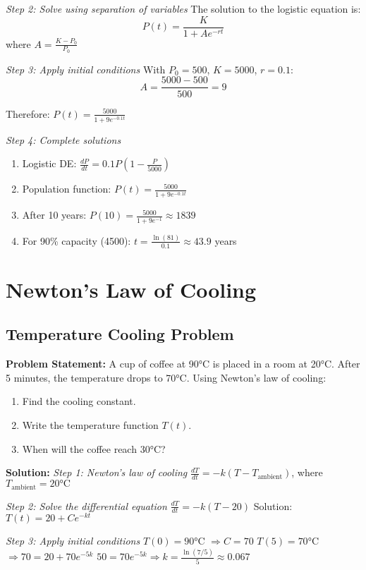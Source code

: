\documentclass[12pt, letterpaper]{book}
\begin{document}
\textit{Step 2: Solve using separation of variables}
The solution to the logistic equation is:
$$P(t) = \frac{K}{1 + Ae^{-rt}}$$
where $A = \frac{K-P_0}{P_0}$

\textit{Step 3: Apply initial conditions}
With $P_0 = 500$, $K = 5000$, $r = 0.1$:
$$A = \frac{5000-500}{500} = 9$$

Therefore: $P(t) = \frac{5000}{1 + 9e^{-0.1t}}$

\textit{Step 4: Complete solutions}
\begin{enumerate}
    \item Logistic DE: $\frac{dP}{dt} = 0.1P\left(1-\frac{P}{5000}\right)$
    \item Population function: $P(t) = \frac{5000}{1 + 9e^{-0.1t}}$
    \item After 10 years: $P(10) = \frac{5000}{1 + 9e^{-1}} \approx 1839$
    \item For 90\% capacity (4500): $t = \frac{\ln(81)}{0.1} \approx 43.9$ years
\end{enumerate}

\section{Newton's Law of Cooling}

\subsection{Temperature Cooling Problem}
\textbf{Problem Statement:}
A cup of coffee at 90°C is placed in a room at 20°C. After 5 minutes, the temperature drops to 70°C. Using Newton's law of cooling:
\begin{enumerate}
    \item Find the cooling constant.
    \item Write the temperature function $T(t)$.
    \item When will the coffee reach 30°C?
\end{enumerate}

\textbf{Solution:}
\textit{Step 1: Newton's law of cooling}
$\frac{dT}{dt} = -k(T - T_{\text{ambient}})$, where $T_{\text{ambient}} = 20°\text{C}$

\textit{Step 2: Solve the differential equation}
$\frac{dT}{dt} = -k(T - 20)$
Solution: $T(t) = 20 + Ce^{-kt}$

\textit{Step 3: Apply initial conditions}
$T(0) = 90°\text{C}$ $\Rightarrow C = 70$
$T(5) = 70°\text{C}$ $\Rightarrow 70 = 20 + 70e^{-5k}$
$50 = 70e^{-5k} \Rightarrow k = \frac{\ln(7/5)}{5} \approx 0.067$
\end{document}
